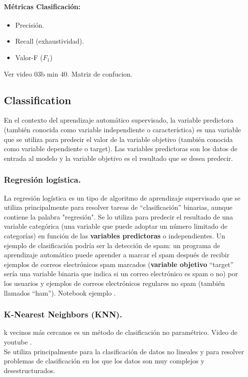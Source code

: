 \documentclass[../main.tex]{subfiles}
\begin{document}
    \paragraph{Métricas Clasificación:}
        \begin{itemize}
            \item Precisión.
            \item Recall (exhaustividad).
            \item Valor-F ($F_1$)
        \end{itemize}
        
        Ver video 03b min 40. Matriz de confucion.

    \subsection{Classification}
        En el contexto del aprendizaje automático supervisado, la variable predictora (también conocida como variable independiente o característica) es una variable que se utiliza para predecir el valor de la variable objetivo (también conocida como variable dependiente o target). Las variables predictoras son los datos de entrada al modelo y la variable objetivo es el resultado que se desea predecir.
        
        \subsubsection{Regresión logística.}
            La regresión logística es un tipo de algoritmo de aprendizaje supervisado que se utiliza principalmente para resolver tareas de “clasificación” binarias, aunque contiene la palabra "regresión". Se lo utiliza para predecir el resultado de una variable categórica (una variable que puede adoptar un número limitado de categorías) en función de las \textbf{variables predictoras} o independientes. Un ejemplo de clasificación podría ser la detección de spam: un programa de aprendizaje automático puede aprender a marcar el spam después de recibir ejemplos de correos electrónicos spam marcados (\textbf{variable objetivo} “target” sería una variable binaria que indica si un correo electrónico es spam o no) por los usuarios y ejemplos de correos electrónicos regulares no spam (también llamados “ham”). Notebook ejemplo \cite{regresión_logística_colab}.

        \subsubsection{K-Nearest Neighbors (KNN).}
            k vecinos más cercanos es un método de clasificación no paramétrico. Video de youtube \cite{knn_you_tube}.\\
            Se utiliza principalmente para la clasificación de datos no lineales y para resolver problemas de clasificación en los que los datos son muy complejos y desestructurados.\\
            
\end{document}
